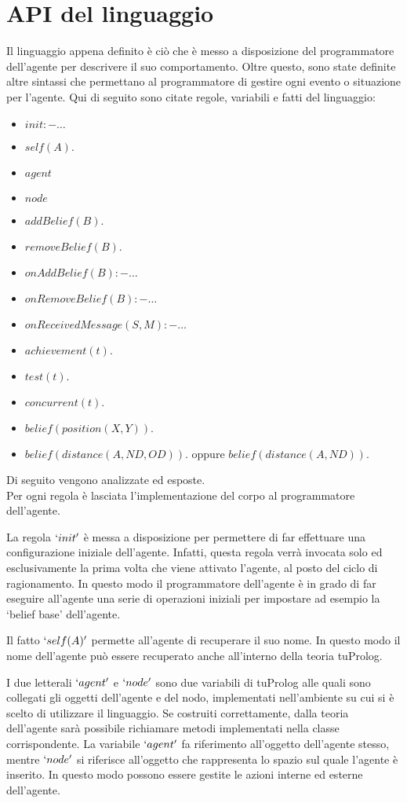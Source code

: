 \section{API del linguaggio}
Il linguaggio appena definito è ciò che è messo a disposizione del programmatore dell'agente per descrivere il suo comportamento. Oltre questo, sono state definite altre sintassi che permettano al programmatore di gestire ogni evento o situazione per l'agente.
Qui di seguito sono citate regole, variabili e fatti del linguaggio:
\begin{itemize}
\item $init :- \ldots$
\item $self(A).$
\item $agent$
\item $node$
\item $addBelief(B).$
\item $removeBelief(B).$
\item $onAddBelief(B) :- \ldots$
\item $onRemoveBelief(B) :- \ldots$
\item $onReceivedMessage(S, M) :- \ldots$
\item $achievement(t).$
\item $test(t).$
\item $concurrent(t).$
\item $belief(position(X,Y)).$
\item $belief(distance(A, ND, OD)).$ oppure $belief(distance(A, ND)).$
\end{itemize}

Di seguito vengono analizzate ed esposte.
\\
Per ogni regola è lasciata l'implementazione del corpo al programmatore dell'agente.

La regola $`init'$ è messa a disposizione per permettere di far effettuare una configurazione iniziale dell'agente. Infatti, questa regola verrà invocata solo ed esclusivamente la prima volta che viene attivato l'agente, al posto del ciclo di ragionamento. In questo modo il programmatore dell'agente è in grado di far eseguire all'agente una serie di operazioni iniziali per impostare ad esempio la `belief base' dell'agente.

\medskip
Il fatto $`self(A)'$ permette all'agente di recuperare il suo nome. In questo modo il nome dell'agente può essere recuperato anche all'interno della teoria tuProlog.

\medskip
I due letterali $`agent'$ e $`node'$ sono due variabili di tuProlog alle quali sono collegati gli oggetti dell'agente e del nodo, implementati nell'ambiente su cui si è scelto di utilizzare il linguaggio. Se costruiti correttamente, dalla teoria dell'agente sarà possibile richiamare metodi implementati nella classe corrispondente. La variabile $`agent'$ fa riferimento all'oggetto dell'agente stesso, mentre $`node'$ si riferisce all'oggetto che rappresenta lo spazio sul quale l'agente è inserito. In questo modo possono essere gestite le azioni interne ed esterne dell'agente.

